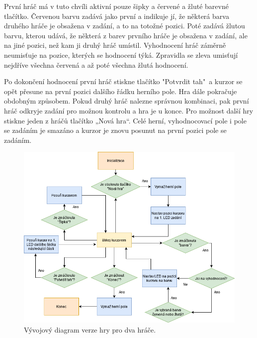První hráč má v tuto chvíli aktivní pouze šipky a červené a žluté barevné tlačítko. Červenou barvu zadává jako první a 
indikuje jí, že některá barva druhého hráče je obsažena v zadání, a to na totožné pozici. Poté zadává žlutou barvu, kterou 
udává, že některá z barev prvního hráče je obsažena v zadání, ale na jiné pozici, než kam ji druhý hráč umístil. Vyhodnocení 
hráč záměrně neumisťuje na pozice, kterých se hodnocení týká. Zpravidla se zleva umisťují nejdříve všechna červená a až poté 
všechna žlutá hodnocení. 

Po dokončení hodnocení první hráč stiskne tlačítko "Potvrdit tah"\  a kurzor se opět přesune na první pozici dalšího řádku herního pole. 
Hra dále pokračuje obdobným způsobem.
Pokud druhý hráč nalezne správnou kombinaci, pak první hráč odkryje zadání pro možnou kontrolu a hra je u konce. Pro možnost další 
hry stiskne jeden z hráčů tlačítko „Nová hra“. Celé herní, vyhodnocovací pole i pole se zadáním je smazáno a kurzor je znovu posunut 
na první pozici pole se zadáním. 

\begin{figure}[!h]
    \begin{center}
        \includegraphics[scale=0.6]{obrazky/vyvojovy_diagram_2_hraci.png}
    \end{center}
    \caption[Vývojový diagram verze hry pro dva hráče]{Vývojový diagram verze hry pro dva hráče.}
    \end{figure}

